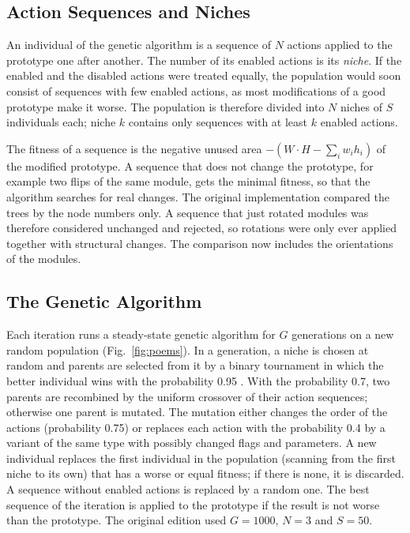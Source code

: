 \subsection{Action Sequences and Niches}

An individual of the genetic algorithm is a sequence of $N$ actions applied to the prototype one after another. The number of its enabled actions is its {\em niche}. If the enabled and the disabled actions were treated equally, the population would soon consist of sequences with few enabled actions, as most modifications of a good prototype make it worse. The population is therefore divided into $N$ niches of $S$ individuals each; niche $k$ contains only sequences with at least $k$ enabled actions.

The fitness of a sequence is the negative unused area $-(W \cdot H - \sum_i w_i h_i)$ of the modified prototype. A sequence that does not change the prototype, for example two flips of the same module, gets the minimal fitness, so that the algorithm searches for real changes. The original implementation compared the trees by the node numbers only. A sequence that just rotated modules was therefore considered unchanged and rejected, so rotations were only ever applied together with structural changes. The comparison now includes the orientations of the modules.

\subsection{The Genetic Algorithm}

Each iteration runs a steady-state genetic algorithm for $G$ generations on a new random population (Fig.~\ref{fig:poems}). In a generation, a niche is chosen at random and parents are selected from it by a binary tournament in which the better individual wins with the probability 0.95 \cite{tournament}. With the probability 0.7, two parents are recombined by the uniform crossover of their action sequences; otherwise one parent is mutated. The mutation either changes the order of the actions (probability 0.75) or replaces each action with the probability 0.4 by a variant of the same type with possibly changed flags and parameters. A new individual replaces the first individual in the population (scanning from the first niche to its own) that has a worse or equal fitness; if there is none, it is discarded. A sequence without enabled actions is replaced by a random one. The best sequence of the iteration is applied to the prototype if the result is not worse than the prototype. The original edition used $G = 1000$, $N = 3$ and $S = 50$.

